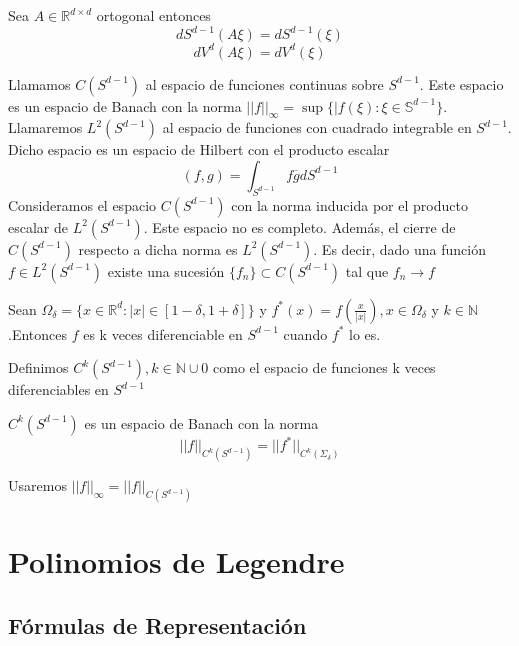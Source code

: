 \begin{prop}
	Sea $A\in\mathds{R}^{d\times d}$ ortogonal entonces
	$$ dS^{d-1}(A\xi) =  dS^{d-1}(\xi)$$
	$$ dV^{d}(A\xi) =  dV^{d}(\xi)$$
\end{prop}

Llamamos $C(S^{d-1})$ al espacio de funciones continuas sobre  $S^{d-1}$. Este espacio es un espacio de Banach con la norma $ ||f||_\infty = \sup \{ |f(\xi) : \xi\in \mathds{S}^{d-1}\}$. Llamaremos $L^2(S^{d-1})$ al espacio de funciones con cuadrado integrable en $S^{d-1}$. Dicho espacio es un espacio de Hilbert con el producto escalar$$ (f,g) = \int_{S^{d-1}} f\overline{g} dS^{d-1}
$$
Consideramos el espacio $C(S^{d-1})$ con la norma inducida por el producto escalar de $L^2(S^{d-1})$. Este espacio no es completo. Además, el cierre de $C(S^{d-1})$ respecto a dicha norma es $L^2(S^{d-1})$. Es decir, dado una función $f\in L^2(S^{d-1})$ existe una sucesión $\{f_n\} \subset C(S^{d-1})$ tal que ${f_n}\to f$

\begin{prop}Sean $\Omega_\delta = \{x\in\mathds{R}^d : |x|\in[1-\delta,1+\delta]\}$ y $f^*(x)= f(\frac{x}{|x|}),x\in\Omega_\delta$ y $k\in\mathds{N}$.Entonces $f$ es k veces diferenciable en $S^{d-1}$ cuando $f^*$ lo es.  
\end{prop}
\begin{defn}Definimos $C^k(S^{d-1}), k\in\mathds{N}\cup0$ como el espacio de funciones k veces diferenciables en $S^{d-1}$
\end{defn}
\begin{prop}$C^k(S^{d-1})$ es un espacio de Banach con la norma 
	$$
	||f||_{C^k(S^{d-1})} = ||f^*||_{C^k(\Sigma_\delta)}
	$$
\end{prop}
\begin{rem}Usaremos $||f||_\infty = ||f||_{C(S^{d-1})}$
	
\end{rem}
\chapter{Polinomios de Legendre}\label{aped.C}
\section{Fórmulas de Representación}

